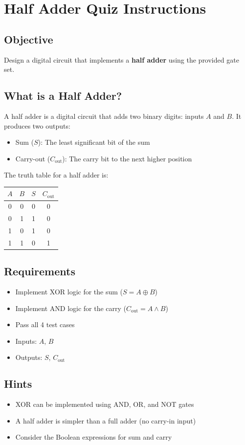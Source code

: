 \section*{Half Adder Quiz Instructions}

\subsection*{Objective}
Design a digital circuit that implements a \textbf{half adder} using the provided gate set.

\subsection*{What is a Half Adder?}
A half adder is a digital circuit that adds two binary digits: inputs $A$ and $B$. It produces two outputs:
\begin{itemize}
  \item Sum ($S$): The least significant bit of the sum
  \item Carry-out ($C_{\text{out}}$): The carry bit to the next higher position
\end{itemize}

The truth table for a half adder is:
\begin{center}
\begin{tabular}{|c|c|c|c|}
\hline
$A$ & $B$ & $S$ & $C_{\text{out}}$ \\
\hline
0 & 0 & 0 & 0 \\
0 & 1 & 1 & 0 \\
1 & 0 & 1 & 0 \\
1 & 1 & 0 & 1 \\
\hline
\end{tabular}
\end{center}

\subsection*{Requirements}
\begin{itemize}
  \item Implement XOR logic for the sum ($S = A \oplus B$)
  \item Implement AND logic for the carry ($C_{\text{out}} = A \land B$)
  \item Pass all 4 test cases
  \item Inputs: $A$, $B$
  \item Outputs: $S$, $C_{\text{out}}$
\end{itemize}

\subsection*{Hints}
\begin{itemize}
  \item XOR can be implemented using AND, OR, and NOT gates
  \item A half adder is simpler than a full adder (no carry-in input)
  \item Consider the Boolean expressions for sum and carry
\end{itemize}
